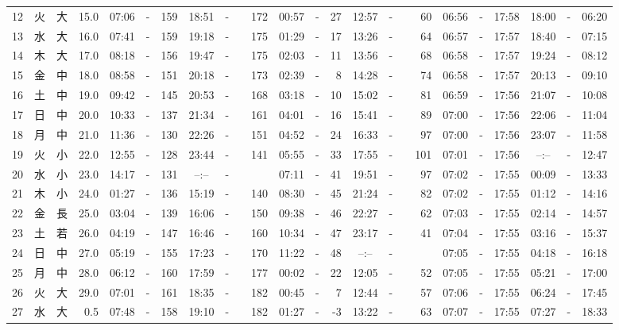 \documentclass[12pt,a4j]{jsarticle}
\begin{document}
\begin{table}[htbp]
\begin{center}
{\begin{tabular}{|rc|cr|ccrccr|ccrccr|ccc|ccc|}
12 & 火 & 大 & 15.0 &  07:06 &-& 159 &  18:51 &-& 172 &  00:57 &-&  27 &  12:57 &-&  60 & 06:56 & -& 17:58 & 18:00 & -& 06:20 \\
13 & 水 & 大 & 16.0 &  07:41 &-& 159 &  19:18 &-& 175 &  01:29 &-&  17 &  13:26 &-&  64 & 06:57 & -& 17:57 & 18:40 & -& 07:15 \\
14 & 木 & 大 & 17.0 &  08:18 &-& 156 &  19:47 &-& 175 &  02:03 &-&  11 &  13:56 &-&  68 & 06:58 & -& 17:57 & 19:24 & -& 08:12 \\
15 & 金 & 中 & 18.0 &  08:58 &-& 151 &  20:18 &-& 173 &  02:39 &-&   8 &  14:28 &-&  74 & 06:58 & -& 17:57 & 20:13 & -& 09:10 \\
16 & 土 & 中 & 19.0 &  09:42 &-& 145 &  20:53 &-& 168 &  03:18 &-&  10 &  15:02 &-&  81 & 06:59 & -& 17:56 & 21:07 & -& 10:08 \\
17 & 日 & 中 & 20.0 &  10:33 &-& 137 &  21:34 &-& 161 &  04:01 &-&  16 &  15:41 &-&  89 & 07:00 & -& 17:56 & 22:06 & -& 11:04 \\
18 & 月 & 中 & 21.0 &  11:36 &-& 130 &  22:26 &-& 151 &  04:52 &-&  24 &  16:33 &-&  97 & 07:00 & -& 17:56 & 23:07 & -& 11:58 \\
19 & 火 & 小 & 22.0 &  12:55 &-& 128 &  23:44 &-& 141 &  05:55 &-&  33 &  17:55 &-& 101 & 07:01 & -& 17:56 & --:-- & -& 12:47 \\
20 & 水 & 小 & 23.0 &  14:17 &-& 131 &  --:-- &-&~~~~~ &  07:11 &-&  41 &  19:51 &-&  97 & 07:02 & -& 17:55 & 00:09 & -& 13:33 \\
21 & 木 & 小 & 24.0 &  01:27 &-& 136 &  15:19 &-& 140 &  08:30 &-&  45 &  21:24 &-&  82 & 07:02 & -& 17:55 & 01:12 & -& 14:16 \\
22 & 金 & 長 & 25.0 &  03:04 &-& 139 &  16:06 &-& 150 &  09:38 &-&  46 &  22:27 &-&  62 & 07:03 & -& 17:55 & 02:14 & -& 14:57 \\
23 & 土 & 若 & 26.0 &  04:19 &-& 147 &  16:46 &-& 160 &  10:34 &-&  47 &  23:17 &-&  41 & 07:04 & -& 17:55 & 03:16 & -& 15:37 \\
24 & 日 & 中 & 27.0 &  05:19 &-& 155 &  17:23 &-& 170 &  11:22 &-&  48 &  --:-- &-&~~~~~ & 07:05 & -& 17:55 & 04:18 & -& 16:18 \\
25 & 月 & 中 & 28.0 &  06:12 &-& 160 &  17:59 &-& 177 &  00:02 &-&  22 &  12:05 &-&  52 & 07:05 & -& 17:55 & 05:21 & -& 17:00 \\
26 & 火 & 大 & 29.0 &  07:01 &-& 161 &  18:35 &-& 182 &  00:45 &-&   7 &  12:44 &-&  57 & 07:06 & -& 17:55 & 06:24 & -& 17:45 \\
27 & 水 & 大 &  0.5 &  07:48 &-& 158 &  19:10 &-& 182 &  01:27 &-&  -3 &  13:22 &-&  63 & 07:07 & -& 17:55 & 07:27 & -& 18:33 \\

\end{tabular}}
\end{center}
\end{table}
\end{document}
